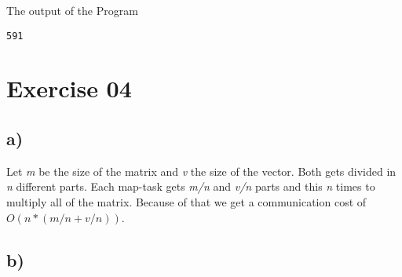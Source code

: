 \documentclass[11pt,a4paper]{scrartcl}
\begin{document}
The output of the Program

\begin{lstlisting}
591
\end{lstlisting}

\section*{Exercise 04}

\subsection*{a)}

Let \textit{m} be the size of the matrix and \textit{v} the size of the vector. Both gets divided in \textit{n} different parts. Each map-task gets \textit{m/n} and \textit{v/n} parts and this \textit{n} times to multiply all of the matrix. Because of that we get a communication cost of $O(n * (m/n + v/n))$.

\subsection*{b)}
\end{document}
